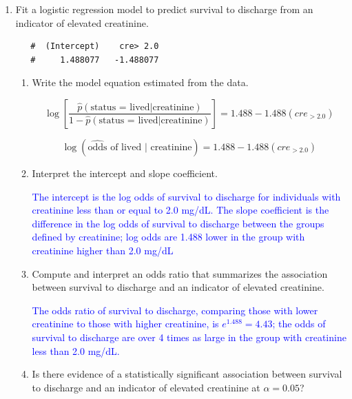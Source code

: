 \documentclass[letterpaper,12pt,twoside,]{pinp}
\begin{document}
\begin{enumerate}
\def\labelenumi{\arabic{enumi}.}
\setcounter{enumi}{3}
\item
  Fit a logistic regression model to predict survival to discharge from
  an indicator of elevated creatinine.

\begin{Shaded}
\begin{Highlighting}[]
\OperatorTok{~}\StringTok{ } \NormalTok{(} \NormalTok{))}\OperatorTok{$}
\end{Highlighting}
\end{Shaded}

  \begin{ShadedResult}
   \begin{verbatim}
   #  (Intercept)    cre> 2.0 
   #     1.488077   -1.488077
   \end{verbatim}
   \end{ShadedResult}

  \begin{enumerate}
  \def\labelenumii{\alph{enumii})}
  \item
    Write the model equation estimated from the data.

    \color{blue}

    \[\log\left[\frac{\hat{p}( \text{status = lived} |\text{creatinine})}{1 - \hat{p}(\text{status = lived} | \text{creatinine})}\right] = 1.488 -1.488(cre_{> 2.0})\]

    \[\log (\widehat{\text{odds}}\text{ of lived | creatinine}) = 1.488 - 1.488(cre_{> 2.0}) \]

    \color{black}
  \item
    Interpret the intercept and slope coefficient.

    \textcolor{blue}{The intercept is the log odds of survival to discharge for individuals with creatinine less than or equal to 2.0 mg/dL. The slope coefficient is the difference in the log odds of survival to discharge between the groups defined by creatinine; log odds are 1.488 lower in the group with creatinine higher than 2.0 mg/dL}
  \item
    Compute and interpret an odds ratio that summarizes the association
    between survival to discharge and an indicator of elevated
    creatinine.

    \textcolor{blue}{The odds ratio of survival to discharge, comparing those with lower creatinine to those with higher creatinine, is $e^{1.488} = 4.43$; the odds of survival to discharge are over 4 times as large in the group with creatinine less than 2.0 mg/dL. }
  \item
    Is there evidence of a statistically significant association between
    survival to discharge and an indicator of elevated creatinine at
    \(\alpha = 0.05\)?


\end{enumerate}
\end{enumerate}
\end{document}
